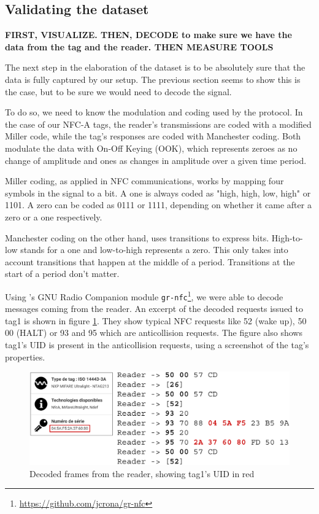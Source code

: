 \subsection{Validating the dataset} \label{validation}

\textbf{FIRST, VISUALIZE. THEN, DECODE to make sure we have the data from the tag and the reader. THEN MEASURE TOOLS}

The next step in the elaboration of the dataset is to be absolutely sure that the data is fully captured by our setup. The previous section seems to show this is the case, but to be sure we would need to decode the signal.

To do so, we need to know the modulation and coding used by the protocol. In the case of our NFC-A tags, the reader's transmissions are coded with a modified Miller code, while the tag's responses are coded with Manchester coding. Both modulate the data with On-Off Keying (OOK), which represents zeroes as no change of amplitude and ones as changes in amplitude over a given time period. \cite{wiki_off_2020}

Miller coding, as applied in NFC communications, works by mapping four symbols in the signal to a bit. A one is always coded as "high, high, low, high" or 1101. A zero can be coded as 0111 or 1111, depending on whether it came after a zero or a one respectively. \cite{phy_nfc_coding}

Manchester coding on the other hand, uses transitions to express bits. High-to-low stands for a one and low-to-high represents a zero. This only takes into account transitions that happen at the middle of a period. Transitions at the start of a period don't matter. \cite{phy_nfc_coding, wiki_manchester_2019}

Using \textcite{rona_sniffing_2017}'s GNU Radio Companion module \texttt{gr-nfc}\footnote{\url{https://github.com/jcrona/gr-nfc}}, we were able to decode messages coming from the reader. An excerpt of the decoded requests issued to tag1 is shown in figure \ref{fig:decoded}. They show typical NFC requests like 52 (wake up), 50 00 (HALT) or 93 and 95 which are anticollision requests. The figure also shows tag1's UID is present in the anticollision requests, using a screenshot of the tag's properties.

\begin{figure}[htp!]
  \centering
  \includegraphics[scale=0.35]{figures/data_decoded-frames_app.png}
  \caption{Decoded frames from the reader, showing tag1's UID in red}
  \label{fig:decoded}
\end{figure}

